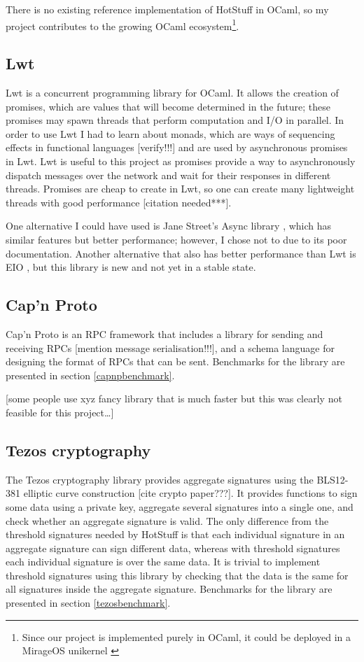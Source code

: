 There is no existing reference implementation of HotStuff in OCaml, so my project contributes to the growing OCaml ecosystem\footnote{Since our project is implemented purely in OCaml, it could be deployed in a MirageOS unikernel \cite{noauthor_mirageos_nodate}}.

\subsection{Lwt}
Lwt \cite{noauthor_lwt_2023} is a concurrent programming library for OCaml. It allows the creation of promises, which are values that will become determined in the future; these promises may spawn threads that perform computation and I/O in parallel. In order to use Lwt I had to learn about monads, which are ways of sequencing effects in functional languages [verify!!!] and are used by asynchronous promises in Lwt. Lwt is useful to this project as promises provide a way to asynchronously dispatch messages over the network and wait for their responses in different threads. Promises are cheap to create in Lwt, so one can create many lightweight threads with good performance [citation needed***].

One alternative I could have used is Jane Street's Async library \cite{noauthor_async_nodate}, which has similar features but better performance; however, I chose not to due to its poor documentation. Another alternative that also has better performance than Lwt is EIO \cite{noauthor_eio_2023}, but this library is new and not yet in a stable state.

\subsection{Cap'n Proto}
Cap'n Proto  \cite{noauthor_capn_nodate} is an RPC framework that includes a library for sending and receiving RPCs [mention message serialisation!!!], and a schema language for designing the format of RPCs that can be sent. Benchmarks for the library are presented in section \ref{capnpbenchmark}.

[some people use xyz fancy library that is much faster but this was clearly not feasible for this project\dots]

\subsection{Tezos cryptography} \label{tezos}
The Tezos cryptography library \cite{noauthor_tezos_nodate} provides aggregate signatures using the BLS12-381 elliptic curve construction [cite crypto paper???]. It provides functions to sign some data using a private key, aggregate several signatures into a single one, and check whether an aggregate signature is valid. The only difference from the threshold signatures needed by HotStuff is that each individual signature in an aggregate signature can sign different data, whereas with threshold signatures each individual signature is over the same data. It is trivial to implement threshold signatures using this library by checking that the data is the same for all signatures inside the aggregate signature. Benchmarks for the library are presented in section \ref{tezosbenchmark}.

